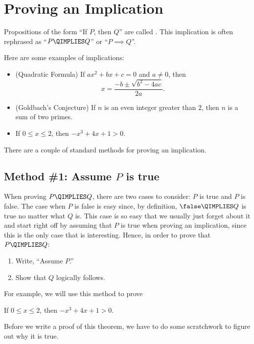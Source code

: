 \section{Proving an Implication}\label{sec:prove_implies}

Propositions of the form ``If $P$, then $Q$'' are called
.  This implication is often rephrased as ``$P
\QIMPLIES Q$'' or ``$P \implies Q$''.

Here are some examples of implications:
%
\begin{itemize}

\item (Quadratic Formula) If $a x^2 + b x + c = 0$ and $a \neq 0$,
then
\[
x = \frac{- b \pm \sqrt{b^2 - 4 a c}}{2a}.
\]

\item (Goldbach's Conjecture) If $n$ is an even integer greater than
$2$, then $n$ is a sum of two primes.

\item If $0 \leq x \leq 2$, then $-x^3 + 4x + 1 > 0$.

\end{itemize}
%
There are a couple of standard methods for proving an implication.

\subsection{Method \#1: Assume $P$ is true}

When proving $P \QIMPLIES Q$, there are two cases to
consider: $P$ is true and $P$ is false.  The case when $P$ is false is
easy since, by definition, $\false \QIMPLIES Q$ is true no matter what
$Q$ is.  This case is so easy that we usually just forget about it and
start right off by assuming that $P$ is true when proving an
implication, since this is the only case that is interesting.  Hence,
in order to prove that $P \QIMPLIES Q$:
%
\begin{enumerate}
\item Write, ``Assume $P$.''
\item Show that $Q$ logically follows.
\end{enumerate}

For example, we will use this method to prove
\begin{theorem}\label{th:-x3+4x+1}
If $0 \leq x \leq 2$, then $-x^3 + 4x + 1 > 0$.
\end{theorem}

Before we write a proof of this theorem, we have to do some
scratchwork to figure out why it is true.

